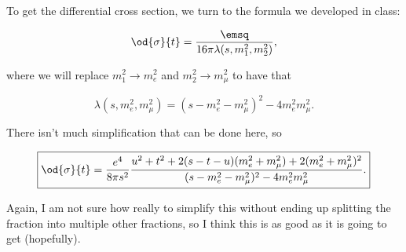 To get the differential cross section, we turn to the formula we developed in class:

\begin{equation*}
    \od{\sigma}{t} = \frac{\emsq}{16\pi\lambda(s, m_1^2, m_2^2)},
\end{equation*}

where we will replace $m_1^2 \rightarrow m_e^2$ and $m_2^2 \rightarrow m_{\mu}^2$ to have that

\begin{equation*}
    \lambda(s, m_e^2, m_{\mu}^2) = (s - m_e^2 - m_{\mu}^2)^2 - 4m_e^2m_{\mu}^2.
\end{equation*}

There isn't much simplification that can be done here, so

\begin{equation*}
    \boxed{\od{\sigma}{t} = \frac{e^4}{8\pi s^2} \frac{u^2 + t^2 + 2(s-t-u)(m_e^2 + m_{\mu}^2) + 2(m_e^2 + m_{\mu}^2)^2}{(s - m_e^2 - m_{\mu}^2)^2 - 4m_e^2m_{\mu}^2}.}
\end{equation*}

Again, I am not sure how really to simplify this without ending up splitting the fraction into multiple other fractions, so I think this is as good as it is going to get (hopefully).